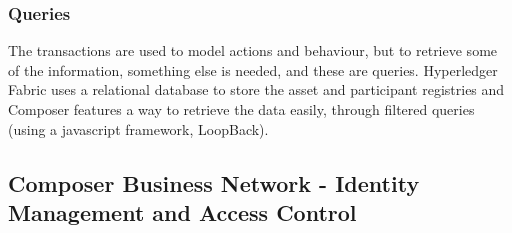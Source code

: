 \subsubsection*{Queries}
The transactions are used to model actions and behaviour, but to retrieve some of the information, something else is needed, and these are queries. Hyperledger Fabric uses a relational database to store the asset and participant registries and Composer features a way to retrieve the data easily, through filtered queries (using a javascript framework, LoopBack).

\subsection{Composer Business Network - Identity Management and Access Control}



